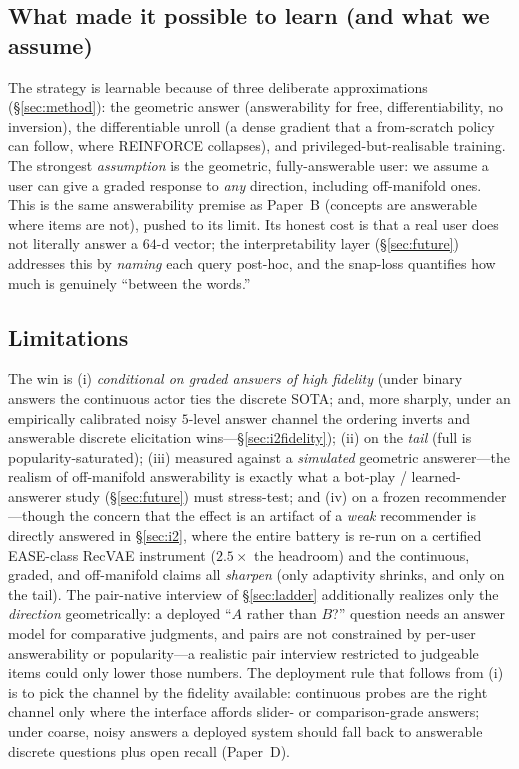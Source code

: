 \documentclass[11pt]{article}
\begin{document}
\subsection{What made it possible to learn (and what we assume)}
The strategy is learnable because of three deliberate approximations (\S\ref{sec:method}): the geometric answer
(answerability for free, differentiability, no inversion), the differentiable unroll (a dense gradient that a
from-scratch policy can follow, where REINFORCE collapses), and privileged-but-realisable training. The strongest
\emph{assumption} is the geometric, fully-answerable user: we assume a user can give a graded response to \emph{any}
direction, including off-manifold ones. This is the same answerability premise as Paper~B (concepts are answerable where
items are not), pushed to its limit. Its honest cost is that a real user does not literally answer a $64$-d vector; the
interpretability layer (\S\ref{sec:future}) addresses this by \emph{naming} each query post-hoc, and the snap-loss
quantifies how much is genuinely ``between the words.''

\subsection{Limitations}
The win is (i) \emph{conditional on graded answers of high fidelity} (under binary answers the continuous actor ties the
discrete SOTA; and, more sharply, under an empirically calibrated noisy $5$-level answer channel the ordering inverts and
answerable discrete elicitation wins---\S\ref{sec:i2fidelity});
(ii) on the \emph{tail} (full is popularity-saturated); (iii) measured against a \emph{simulated} geometric
answerer---the realism of off-manifold answerability is exactly what a bot-play / learned-answerer study
(\S\ref{sec:future}) must stress-test; and (iv) on a frozen recommender---though the concern that the effect is an
artifact of a \emph{weak} recommender is directly answered in \S\ref{sec:i2}, where the entire battery is re-run on a
certified EASE-class RecVAE instrument ($2.5\times$ the headroom) and the continuous, graded, and off-manifold claims all
\emph{sharpen} (only adaptivity shrinks, and only on the tail). The pair-native
interview of \S\ref{sec:ladder} additionally realizes only the \emph{direction} geometrically: a deployed ``$A$ rather
than $B$?'' question needs an answer model for comparative judgments, and pairs are not constrained by per-user
answerability or popularity---a realistic pair interview restricted to judgeable items could only lower those numbers.
The deployment rule that follows from (i) is to pick the channel by the fidelity available: continuous probes are the
right channel only where the interface affords slider- or comparison-grade answers; under coarse, noisy answers a
deployed system should fall back to answerable discrete questions plus open recall (Paper~D).
\end{document}
